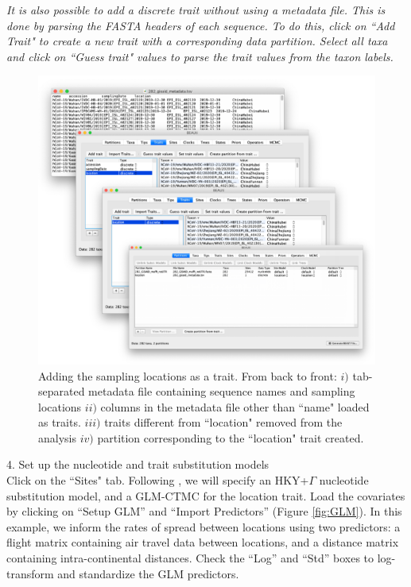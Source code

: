 \documentclass{article}
\newcommand{\ann}[1]{
\begin{adjustwidth}{0.5cm}{}
\it{#1}\\
\end{adjustwidth}}
\begin{document}
\ann{It is also possible to add a discrete trait without using a metadata file. This is done by parsing the FASTA headers of each sequence. To do this, click on ``Add Trait" to create a new trait with a corresponding data partition. Select all taxa and click on ``Guess trait" values to parse the trait values from the taxon labels.}

\begin{figure}[!ht]
    \centering
    \includegraphics[width=1\textwidth]{figs/location_trait.pdf}
    \caption{Adding the sampling locations as a trait. From back to front: $i)$ tab-separated metadata file containing sequence names and sampling locations $ii)$ columns in the metadata file other than ``name" loaded as traits. $iii)$ traits different from ``location" removed from the analysis $iv)$ partition corresponding to the ``location" trait created.}
    \label{fig:location}
\end{figure}

\clearpage

4. Set up the nucleotide and trait substitution models\\

Click on the ``Sites" tab. Following \cite{travhist}, we will specify an HKY+$\Gamma$ nucleotide substitution model, and a GLM-CTMC for the location trait.
Load the covariates by clicking on ``Setup GLM'' and ``Import Predictors'' (Figure \ref{fig:GLM}). In this example, we inform the rates of spread between locations using two predictors: a flight matrix containing air travel data between locations, and a distance matrix containing intra-continental distances. %
Check the ``Log'' and ``Std'' boxes to log-transform and standardize the GLM predictors.\\
\end{document}
